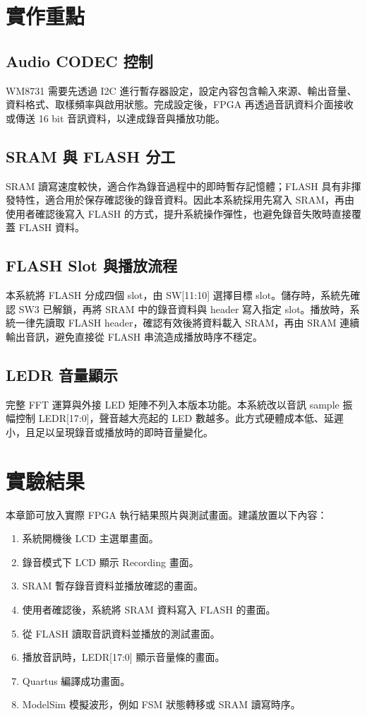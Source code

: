 \section{實作重點}

\subsection{Audio CODEC 控制}

WM8731 需要先透過 I2C 進行暫存器設定，設定內容包含輸入來源、輸出音量、資料格式、取樣頻率與啟用狀態。完成設定後，FPGA 再透過音訊資料介面接收或傳送 16 bit 音訊資料，以達成錄音與播放功能。

\subsection{SRAM 與 FLASH 分工}

SRAM 讀寫速度較快，適合作為錄音過程中的即時暫存記憶體；FLASH 具有非揮發特性，適合用於保存確認後的錄音資料。因此本系統採用先寫入 SRAM，再由使用者確認後寫入 FLASH 的方式，提升系統操作彈性，也避免錄音失敗時直接覆蓋 FLASH 資料。

\subsection{FLASH Slot 與播放流程}

本系統將 FLASH 分成四個 slot，由 SW[11:10] 選擇目標 slot。儲存時，系統先確認 SW3 已解鎖，再將 SRAM 中的錄音資料與 header 寫入指定 slot。播放時，系統一律先讀取 FLASH header，確認有效後將資料載入 SRAM，再由 SRAM 連續輸出音訊，避免直接從 FLASH 串流造成播放時序不穩定。

\subsection{LEDR 音量顯示}

完整 FFT 運算與外接 LED 矩陣不列入本版本功能。本系統改以音訊 sample 振幅控制 LEDR[17:0]，聲音越大亮起的 LED 數越多。此方式硬體成本低、延遲小，且足以呈現錄音或播放時的即時音量變化。

\section{實驗結果}

本章節可放入實際 FPGA 執行結果照片與測試畫面。建議放置以下內容：

\begin{enumerate}
\item 系統開機後 LCD 主選單畫面。
\item 錄音模式下 LCD 顯示 Recording 畫面。
\item SRAM 暫存錄音資料並播放確認的畫面。
\item 使用者確認後，系統將 SRAM 資料寫入 FLASH 的畫面。
\item 從 FLASH 讀取音訊資料並播放的測試畫面。
\item 播放音訊時，LEDR[17:0] 顯示音量條的畫面。
\item Quartus 編譯成功畫面。
\item ModelSim 模擬波形，例如 FSM 狀態轉移或 SRAM 讀寫時序。
\end{enumerate}

